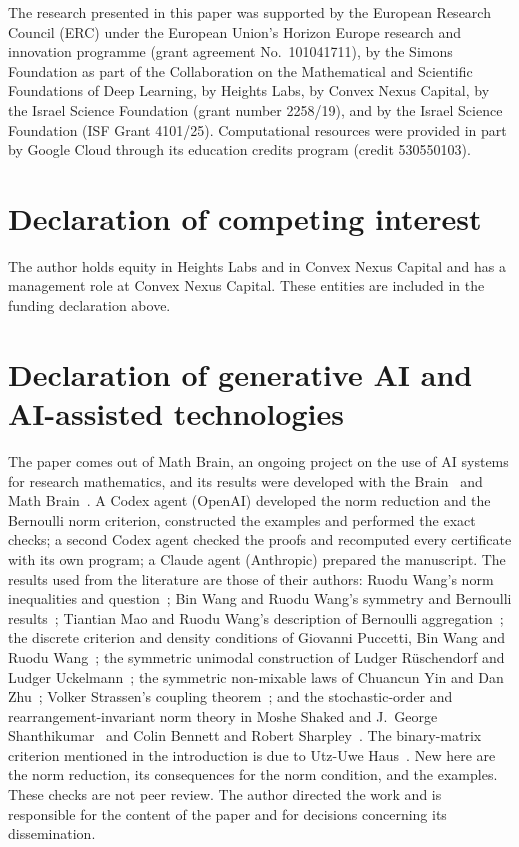 \documentclass[11pt]{amsart}
\theoremstyle{definition}
\begin{document}
The research presented in this paper was supported by the European Research Council (ERC) under the European Union's
Horizon Europe research and innovation programme (grant agreement No.~101041711), by the Simons Foundation as part of
the Collaboration on the Mathematical and Scientific Foundations of Deep Learning, by Heights Labs, by Convex Nexus
Capital, by the Israel Science Foundation (grant number 2258/19), and by the Israel Science Foundation (ISF Grant
4101/25). Computational resources were provided in part by Google Cloud through its education credits program (credit
530550103).

\section*{Declaration of competing interest}
The author holds equity in Heights Labs and in Convex Nexus Capital and has a management role at Convex Nexus Capital.
These entities are included in the funding declaration above.

\section*{Declaration of generative AI and AI-assisted technologies}
The paper comes out of Math Brain, an ongoing project on the use of AI systems for research mathematics, and its
results were developed with the Brain~\cite{BrainFramework} and Math Brain~\cite{MathBrainRepo}. A Codex agent
(OpenAI) developed the norm reduction and the Bernoulli norm criterion, constructed the examples and performed the
exact checks; a second Codex agent checked the proofs and recomputed every certificate with its own program; a Claude
agent (Anthropic) prepared the manuscript. The results used from the literature are those of their authors: Ruodu
Wang's norm inequalities and question~\cite{W15}; Bin Wang and Ruodu Wang's symmetry and Bernoulli results~\cite{WW11};
Tiantian Mao and Ruodu Wang's description of Bernoulli aggregation~\cite{MW15}; the discrete criterion and density
conditions of Giovanni Puccetti, Bin Wang and Ruodu Wang~\cite{PWW12,PWW13}; the symmetric unimodal construction of
Ludger R\"uschendorf and Ludger Uckelmann~\cite{RU02}; the symmetric non-mixable laws of Chuancun Yin and Dan
Zhu~\cite{YZ}; Volker Strassen's coupling theorem~\cite{Str65}; and the stochastic-order and rearrangement-invariant
norm theory in Moshe Shaked and J.~George Shanthikumar~\cite{SS07} and Colin Bennett and Robert Sharpley~\cite{BS88}.
The binary-matrix criterion mentioned in the introduction is due to Utz-Uwe Haus~\cite{Haus15}. New here are the norm reduction, its consequences for the norm condition, and the examples. These checks are not peer
review. The author directed the work and is responsible for the content of the paper and
for decisions concerning its dissemination.
\end{document}
